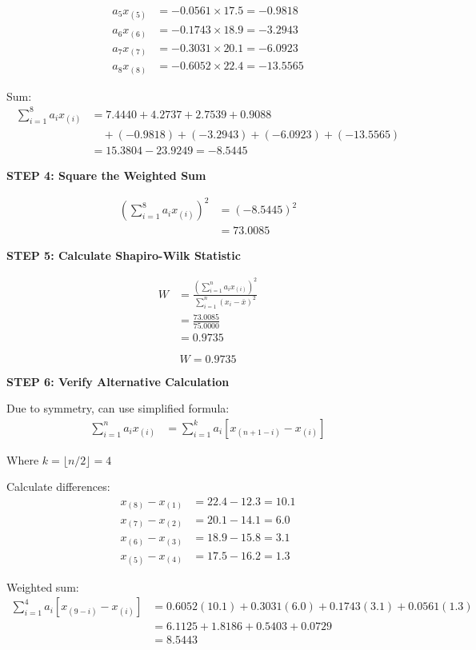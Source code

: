 \documentclass[12pt]{article}
\begin{document}
\begin{solution}
\begin{align*}
a_5 x_{(5)} &= -0.0561 \times 17.5 = -0.9818 \\
a_6 x_{(6)} &= -0.1743 \times 18.9 = -3.2943 \\
a_7 x_{(7)} &= -0.3031 \times 20.1 = -6.0923 \\
a_8 x_{(8)} &= -0.6052 \times 22.4 = -13.5565
\end{align*}

Sum:
\begin{align*}
\sum_{i=1}^{8} a_i x_{(i)} &= 7.4440 + 4.2737 + 2.7539 + 0.9088 \\
&\quad + (-0.9818) + (-3.2943) + (-6.0923) + (-13.5565) \\
&= 15.3804 - 23.9249 = -8.5445
\end{align*}

\textbf{STEP 4: Square the Weighted Sum}

\begin{align*}
\left(\sum_{i=1}^{8} a_i x_{(i)}\right)^2 &= (-8.5445)^2 \\
&= 73.0085
\end{align*}

\textbf{STEP 5: Calculate Shapiro-Wilk Statistic}

\begin{align*}
W &= \frac{\left(\sum_{i=1}^{n} a_i x_{(i)}\right)^2}{\sum_{i=1}^{n} (x_i - \bar{x})^2} \\
&= \frac{73.0085}{75.0000} \\
&= 0.9735
\end{align*}

\[\boxed{W = 0.9735}\]

\textbf{STEP 6: Verify Alternative Calculation}

Due to symmetry, can use simplified formula:
\begin{align*}
\sum_{i=1}^{n} a_i x_{(i)} &= \sum_{i=1}^{k} a_i [x_{(n+1-i)} - x_{(i)}]
\end{align*}

Where $k = \lfloor n/2 \rfloor = 4$

Calculate differences:
\begin{align*}
x_{(8)} - x_{(1)} &= 22.4 - 12.3 = 10.1 \\
x_{(7)} - x_{(2)} &= 20.1 - 14.1 = 6.0 \\
x_{(6)} - x_{(3)} &= 18.9 - 15.8 = 3.1 \\
x_{(5)} - x_{(4)} &= 17.5 - 16.2 = 1.3
\end{align*}

Weighted sum:
\begin{align*}
\sum_{i=1}^{4} a_i [x_{(9-i)} - x_{(i)}] &= 0.6052(10.1) + 0.3031(6.0) + 0.1743(3.1) + 0.0561(1.3) \\
&= 6.1125 + 1.8186 + 0.5403 + 0.0729 \\
&= 8.5443
\end{align*}


\end{solution}
\end{document}
